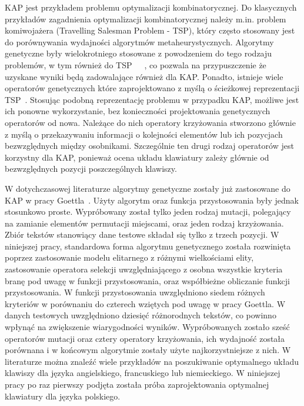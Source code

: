 \documentclass{xmgr}
\begin{document}
KAP jest przykładem problemu optymalizacji kombinatorycznej. Do klasycznych przykładów zagadnienia optymalizacji kombinatorycznej należy m.in. problem komiwojażera (Travelling Salesman Problem - TSP), który często stosowany jest do porównywania wydajności algorytmów metaheurystycznych. Algorytmy genetyczne były wielokrotniego stosowane z powodzeniem do tego rodzaju problemów, w tym również do TSP~\cite{Michalewicz:2003:AGSDPE}~\cite{Brady}~\cite{Stutzle:2000:CNI:645825.668943}, co pozwala na przypuszczenie że uzyskane wyniki będą zadowalające również dla KAP. Ponadto, istnieje wiele operatorów genetycznych które zaprojektowano z myślą o ścieżkowej reprezentacji TSP~\cite{Larranaga99geneticalgorithms}. Stosując podobną reprezentację problemu w przypadku KAP, możliwe jest ich ponowne wykorzystanie, bez konieczności projektowania genetycznych operatorów od nowa. Należące do nich operatory krzyżowania stworzono głównie z myślą o przekazywaniu informacji o kolejności elementów lub ich pozycjach bezwzględnych między osobnikami. Szczególnie ten drugi rodzaj operatorów jest korzystny dla KAP, ponieważ ocena układu klawiatury zależy głównie od bezwzględnych pozycji poszczególnych klawiszy.

W dotychczasowej literaturze algorytmy genetyczne zostały już zastosowane do KAP w pracy Goettla~\cite{Call:2005:CME}. Użyty algorytm oraz funkcja przystosowania były jednak stosunkowo proste. Wypróbowany został tylko jeden rodzaj mutacji, polegający na zamianie elementów permutacji miejscami, oraz jeden rodzaj krzyżowania. Zbiór tekstów stanowiący dane testowe składał się tylko z trzech pozycji. W niniejszej pracy, standardowa forma algorytmu genetycznego została rozwinięta poprzez zastosowanie modelu elitarnego z różnymi wielkościami elity, zastosowanie operatora selekcji uwzględniającego z osobna wszystkie kryteria branę pod uwagę w funkcji przystosowania, oraz współbieżne obliczanie funkcji przystosowania. W funkcji przystosowania uwzględniono siedem różnych kryteriów w porównaniu do czterech wziętych pod uwagę w pracy Goettla. W danych testowych uwzględniono dziesięć różnorodnych tekstów, co powinno wpłynąć na zwiększenie wiarygodności wyników. Wypróbowanych zostało sześć operatorów mutacji oraz cztery operatory krzyżowania, ich wydajność została porównana i w końcowym algorytmie zostały użyte najkorzystniejsze z nich. W literaturze można znaleźć wiele przykładów na poszukiwanie optymalnego układu klawiszy dla języka angielskiego, francuskiego lub niemieckiego. W niniejszej pracy po raz pierwszy podjęta została próba zaprojektowania optymalnej klawiatury dla języka polskiego.
\end{document}
